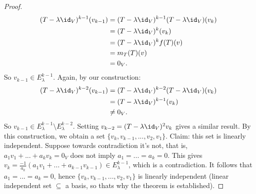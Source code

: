 \begin{proof}
\begin{equation*}
                \begin{split}
                    (T - \lambda \id_V)^{k-1}(v_{k-1}) 
                    & = (T - \lambda \id_V)^{k-1} (T - \lambda \id_V)(v_k) \\
                    & = (T - \lambda \id_V)^k (v_k)\\
                    & = (T - \lambda \id_V)^k f(T)(v) \\
                    & = m_T(T)(v) \\
                    & = 0_V.
                \end{split}
                \end{equation*}
            So $v_{k-1} \in E_\lambda^{k-1}$. Again, by our construction:
                \begin{equation*}
                \begin{split}
                    (T - \lambda \id_V)^{k-2}(v_{k-1})
                    & = (T - \lambda \id_V)^{k-2}(T - \lambda \id_V)(v_k) \\
                    & =(T - \lambda \id_V)^{k-1}(v_k) \\
                    & \neq 0_V.
                \end{split}
                \end{equation*}
            So $v_{k-1} \in E_\lambda^{k-1} \setminus E_\lambda^{k-2}$. Setting $v_{k-2} = (T - \lambda \id_V)^2v_k$ gives a similar result. By this construction, we obtain a set $\{v_k,v_{k-1},...,v_2,v_1\}$. Claim: this set is linearly independent. Suppose towards contradiction it's not, that is, $a_1v_1 + ... + a_k v_k = 0_V$ does not imply $a_1 = ... = a_k = 0$. This gives $v_k = \frac{-1}{a_k}(a_1v_1 + ... + a_{k-1}v_{k-1}) \in E_\lambda^{k-1}$, which is a contradiction. It follows that $a_1 = ... = a_k = 0$, hence $\{v_k,v_{k-1},...,v_2,v_1\}$ is linearly independent (linear independent set $\subseteq$ a basis, so thats why the theorem is established).
        \end{proof}

